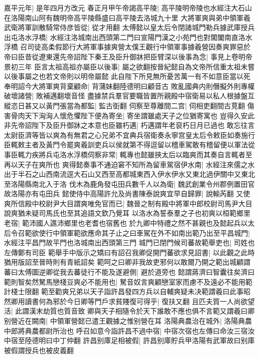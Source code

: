 嘉平元年|{
	是年四月方改元}
春正月甲午帝謁高平陵|{
	高平陵明帝陵也水經注大石山在洛陽南山阿有魏明帝高平陵縣盛曰高平陵去洛城九十里}
大將軍爽與弟中領軍羲武衛將軍訓散騎常侍彦皆從|{
	從才用翻}
太傅懿以皇太后令閉諸城門勒兵據武庫授兵出屯洛水浮橋|{
	水經注洛城南出西頭第二門曰宣陽門漢之小苑門也對閶闔南直洛水浮橋}
召司徒高柔假節行大將軍事據爽營太僕王觀行中領軍事據羲營因奏爽罪惡於帝曰臣昔從遼東還先帝詔陛下秦王及臣升御牀把臣臂深以後事為念|{
	事見上卷明帝景初三年}
臣言太祖高祖亦屬臣以後事|{
	屬之欲翻按晉紀懿自為文帝所信重太祖未嘗以後事屬之也若文帝則以明帝屬懿}
此自陛下所見無所憂苦萬一有不如意臣當以死奉明詔今大將軍爽背棄顧命|{
	背蒲妹翻陸德明曰顧音古}
敗亂國典内則僭擬外則專權破壞諸營|{
	敗補邁翻壞音怪}
盡據禁兵羣官要職皆置所親殿中宿衛易以私人根據盤互縱恣日甚又以黃門張當為都監|{
	監古衘翻}
伺察至尊離間二宫|{
	伺相吏翻間古莧翻}
傷害骨肉天下洶洶人懷危懼陛下便為寄坐|{
	寄坐謂雖處天子之位猶寄寓也}
豈得久安此非先帝詔陛下及臣升御牀之本意也臣雖朽邁|{
	朽邁謂年老裒朽日月已過也}
敢忘往言太尉臣濟等皆以爽為有無君之心兄弟不宜典兵宿衛奏永寧宫皇太后令敕臣如奏施行臣輒敕主者及黃門令罷爽羲訓吏兵以侯就第不得逗留以稽車駕敢有稽留便以軍法從事臣輒力疾將兵屯洛水浮橋伺察非常|{
	輒專也懿雖挾太后以臨爽而其奏自言輒者至再以天子在爽所也}
爽得懿奏事不通迫窘不知所為留車駕宿伊水南|{
	水經注來儒之水出于半石之山西南流逕大石山又西至高都城東西入伊水伊水又東北過伊關中又東北至洛陽縣南北入于洛}
伐木為鹿角發屯田兵數千人以為衛|{
	魏武創業令州郡例置田官故洛陽亦有屯田兵}
懿使侍中高陽許允及尚書陳泰說爽宜早自歸罪|{
	說輸芮翻}
又使爽所信殿中校尉尹大目謂爽唯免官而已|{
	魏晉之制有殿中將軍中郎校尉司馬尹大目說爽猶未疑司馬氏也至其追語文欽乃覺耳}
以洛水為誓泰羣之子也初爽以桓範鄉里老宿|{
	範沛國人譙沛鄉里也老耆也宿舊也}
於九卿中特禮之然不甚親也及懿起兵以太后令召範欲使行中領軍範欲應命其子止之曰車駕在外不如南出範乃出至平昌城門|{
	水經注平昌門故平門也洛城南出西頭第三門}
城門已閉門候司蕃故範舉吏也|{
	司姓也左傳鄭有司臣}
範舉手中版示之矯曰有詔召我卿促開門蕃欲求見詔書|{
	以此觀之此時猶用版詔至晉時則有青紙詔矣}
範呵之曰卿非我故吏邪何以敢爾乃開之範出城顧謂蕃曰太傅圖逆卿從我去蕃徒行不能及遂避側|{
	避於道旁也}
懿謂蔣濟曰智囊往矣濟曰範則智矣然駑馬戀棧豆爽必不能用也|{
	駑音奴言爽顧戀室家而慮不及遠必不能用範計棧士限翻}
範至勸爽兄弟以天子詣許昌發四方兵以自輔爽疑未决範謂羲曰此事昭然卿用讀書何為邪於今日卿等門戶求貧賤復可得乎|{
	復扶又翻}
且匹夫質一人尚欲望活|{
	此謂漢末劫質也質音致}
卿與天子相隨令於天下誰敢不應也俱不言範又謂羲曰卿别營近在闕南|{
	中領軍營懿已遣王觀據之惟别營在耳}
洛陽典農治在城外|{
	洛陽典農中郎將典農都尉所治也}
呼召如意今詣許昌不過中宿|{
	中宿次宿也左傳曰命汝三宿汝中宿至陸德明曰中丁仲翻}
許昌别庫足相被假|{
	許昌别庫貯兵甲洛陽有武軍故曰别庫被假謂授兵也被皮義翻}
